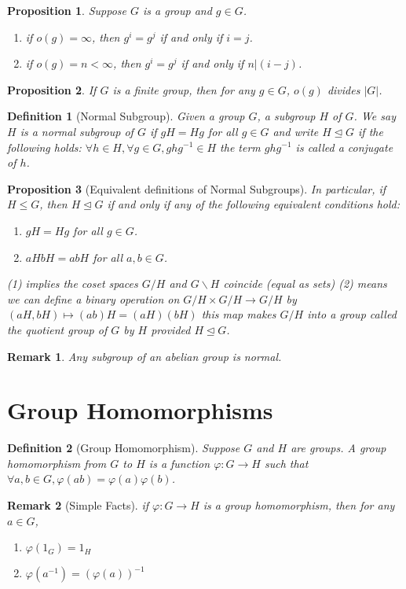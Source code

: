 \documentclass[12pt]{article}
\newtheorem{definition}{Definition}[section]
\newtheorem{proposition}{Proposition}[section]
\newtheorem{remark}{Remark}[section]
\begin{document}
\begin{proposition}
    Suppose $G$ is a group and $g \in G$.
    \begin{enumerate}
        \item if $o(g) = \infty$, then $g^i = g^j$ if and only if $i = j$.
        \item if $o(g) = n < \infty$, then $g^i = g^j$ if and only if $n | (i-j)$.
    \end{enumerate}
\end{proposition}

\begin{proposition}
If $G$ is a finite group, then for any $g \in G$, $o(g)$ divides $|G|$.
\end{proposition}

\begin{definition}[Normal Subgroup]
Given a group $G$, a subgroup $H$ of $G$. We say $H$ is a \emph{normal subgroup} of $G$ if $gH = Hg$ for all $g \in G$ and write $H \trianglelefteq G$ if the following holds: $\forall h \in H, \forall g \in G, ghg^{-1} \in H$ the term $ghg^{-1}$ is called a conjugate of $h$.
\end{definition}

\begin{proposition}[Equivalent definitions of Normal Subgroups]
    In particular, if $H \leq G$, then $H \trianglelefteq G$ if and only if any of the following equivalent conditions hold:
    \begin{enumerate}
        \item $gH = Hg$ for all $g \in G$.
        \item $aHbH = abH$ for all $a,b \in G$.
    \end{enumerate}
    (1) implies the coset spaces $G/H$ and $G\backslash H$ coincide (equal as sets)
    (2) means we can define a binary operation on $G/H \times G/H \to G/H$ by $(aH,bH) \mapsto (ab)H = (aH)(bH)$ 
    this map makes $G/H$ into a group called the quotient group of $G$ by $H$ provided $H \trianglelefteq G$.
\end{proposition}

\begin{remark}
    Any subgroup of an abelian group is normal.
\end{remark}

\section{Group Homomorphisms}

\begin{definition}[Group Homomorphism]
Suppose $G$ and $H$ are groups. A group homomorphism from $G$ to $H$ is a function $\varphi : G \to H$ such that
$\forall a,b \in G, \varphi(ab) = \varphi(a)\varphi(b)$.
\end{definition}
\begin{remark}[Simple Facts]
    if $\varphi : G \to H$ is a group homomorphism, then for any $a \in G$,
    \begin{enumerate}
        \item $\varphi(1_G) = 1_H$
        \item $\varphi(a^{-1}) = (\varphi(a))^{-1}$
    \end{enumerate}
\end{remark}
\end{document}
